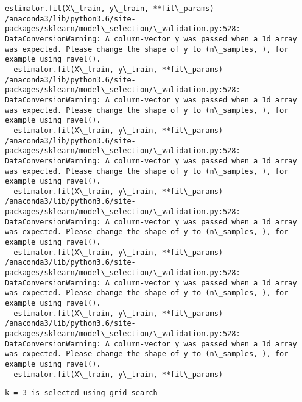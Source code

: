 \documentclass[11pt]{article}
\begin{document}
\begin{Verbatim}[commandchars=\\\{\}]
  estimator.fit(X\_train, y\_train, **fit\_params)
/anaconda3/lib/python3.6/site-packages/sklearn/model\_selection/\_validation.py:528: DataConversionWarning: A column-vector y was passed when a 1d array was expected. Please change the shape of y to (n\_samples, ), for example using ravel().
  estimator.fit(X\_train, y\_train, **fit\_params)
/anaconda3/lib/python3.6/site-packages/sklearn/model\_selection/\_validation.py:528: DataConversionWarning: A column-vector y was passed when a 1d array was expected. Please change the shape of y to (n\_samples, ), for example using ravel().
  estimator.fit(X\_train, y\_train, **fit\_params)
/anaconda3/lib/python3.6/site-packages/sklearn/model\_selection/\_validation.py:528: DataConversionWarning: A column-vector y was passed when a 1d array was expected. Please change the shape of y to (n\_samples, ), for example using ravel().
  estimator.fit(X\_train, y\_train, **fit\_params)
/anaconda3/lib/python3.6/site-packages/sklearn/model\_selection/\_validation.py:528: DataConversionWarning: A column-vector y was passed when a 1d array was expected. Please change the shape of y to (n\_samples, ), for example using ravel().
  estimator.fit(X\_train, y\_train, **fit\_params)
/anaconda3/lib/python3.6/site-packages/sklearn/model\_selection/\_validation.py:528: DataConversionWarning: A column-vector y was passed when a 1d array was expected. Please change the shape of y to (n\_samples, ), for example using ravel().
  estimator.fit(X\_train, y\_train, **fit\_params)
/anaconda3/lib/python3.6/site-packages/sklearn/model\_selection/\_validation.py:528: DataConversionWarning: A column-vector y was passed when a 1d array was expected. Please change the shape of y to (n\_samples, ), for example using ravel().
  estimator.fit(X\_train, y\_train, **fit\_params)

    \end{Verbatim}

    \begin{Verbatim}[commandchars=\\\{\}]
k = 3 is selected using grid search

    \end{Verbatim}
\end{document}
